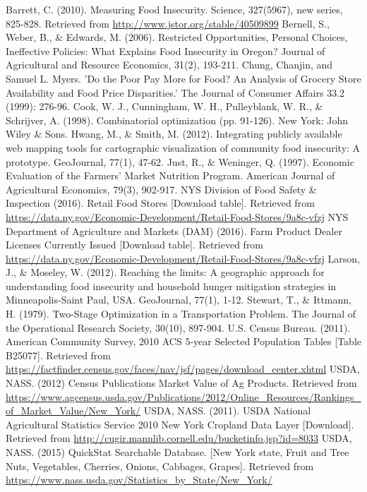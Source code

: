 \documentclass{report}
\begin{document}
\begin{thebibliography}{99}
Barrett, C. (2010). Measuring Food Insecurity. Science, 327(5967), new series, 825-828. Retrieved from \url{http://www.jstor.org/stable/40509899}
Bernell, S., Weber, B., {\&} Edwards, M. (2006). Restricted Opportunities, Personal Choices, Ineffective Policies: What Explains Food Insecurity in Oregon? Journal of Agricultural and Resource Economics, 31(2), 193-211. 
 Chung, Chanjin, and Samuel L. Myers. 'Do the Poor Pay More for Food? An Analysis of Grocery Store Availability and Food Price Disparities.' The Journal of Consumer Affairs 33.2 (1999): 276-96.
 Cook, W. J., Cunningham, W. H., Pulleyblank, W. R.,  {\&}  Schrijver, A. (1998). Combinatorial optimization (pp. 91-126). New York: John Wiley  {\&}  Sons.
 Hwang, M., {\&} Smith, M. (2012). Integrating publicly available web mapping tools for cartographic visualization of community food insecurity: A prototype. GeoJournal, 77(1), 47-62.
 Just, R., {\&} Weninger, Q. (1997). Economic Evaluation of the Farmers' Market Nutrition Program. American Journal of Agricultural Economics, 79(3), 902-917.
 NYS Division of Food Safety {\&} Inspection (2016). Retail Food Stores [Download table]. Retrieved from \url{https://data.ny.gov/Economic-Development/Retail-Food-Stores/9a8c-vfzj}
 NYS Department of Agriculture and Markets (DAM) (2016). Farm Product Dealer Licenses Currently Issued [Download table]. Retrieved from \url{https://data.ny.gov/Economic-Development/Retail-Food-Stores/9a8c-vfzj}
 Larson, J., {\&} Moseley, W. (2012). Reaching the limits: A geographic approach for understanding food insecurity and household hunger mitigation strategies in Minneapolis-Saint Paul, USA. GeoJournal, 77(1), 1-12.
 Stewart, T., {\&} Ittmann, H. (1979). Two-Stage Optimization in a Transportation Problem. The Journal of the Operational Research Society, 30(10), 897-904.
 U.S. Census Bureau. (2011). American Community Survey, 2010 ACS 5-year Selected Population Tables [Table B25077]. Retrieved from \url{https://factfinder.census.gov/faces/nav/jsf/pages/download_center.xhtml}
 USDA, NASS. (2012) Census Publications Market Value of Ag Products. Retrieved from \url{https://www.agcensus.usda.gov/Publications/2012/Online_Resources/Rankings_of_Market_Value/New_York/}
 USDA, NASS. (2011). USDA National Agricultural Statistics Service 2010 New York Cropland Data Layer [Download]. Retrieved from \url{http://cugir.mannlib.cornell.edu/bucketinfo.jsp?id=8033}
 USDA, NASS. (2015) QuickStat Searchable Database. [New York state, Fruit and Tree Nuts, Vegetables, Cherries, Onions, Cabbages, Grapes]. Retrieved from \url{https://www.nass.usda.gov/Statistics_by_State/New_York/}

\end{thebibliography}
\end{document}
